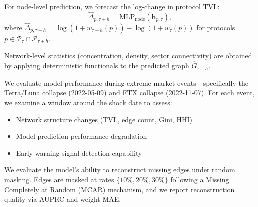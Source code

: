 \documentclass[preprint,12pt]{elsarticle}
\renewcommand{\paragraph}[1]{}
\begin{document}
For node-level prediction, we forecast the log-change in protocol TVL:
\begin{equation}
\widehat{\Delta}_{p,\tau+h} = \mathrm{MLP}_{\mathrm{node}}(\mathbf{h}_{p,\tau}),
\end{equation}
where $\widehat{\Delta}_{p,\tau+h} = \log(1+w_{\tau+h}(p)) - \log(1+w_{\tau}(p))$ for protocols $p\in\mathcal{P}_{\tau}\cap\mathcal{P}_{\tau+h}$.

Network-level statistics (concentration, density, sector connectivity) are obtained by applying deterministic functionals to the predicted graph $\widehat{G}_{\tau+h}$.

\paragraph{(2) Shock analysis.}
We evaluate model performance during extreme market events---specifically the Terra/Luna collapse (2022-05-09) and FTX collapse (2022-11-07). For each event, we examine a window around the shock date to assess:
\begin{itemize}
  \item Network structure changes (TVL, edge count, Gini, HHI)
  \item Model prediction performance degradation
  \item Early warning signal detection capability
\end{itemize}

\paragraph{(3) Imputation.}
We evaluate the model's ability to reconstruct missing edges under random masking. Edges are masked at rates $\{10\%, 20\%, 30\%\}$ following a Missing Completely at Random (MCAR) mechanism, and we report reconstruction quality via AUPRC and weight MAE.
\end{document}
